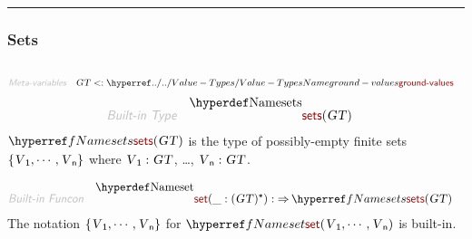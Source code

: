 

\begin{center}
\rule{3in}{0.4pt}
\end{center}

\subsubsection{Sets}\hypertarget{sets}{}\label{sets}

\begin{align*}
  [ \
  \KEY{Type} \quad & \NAMEREF{sets} \\
  \KEY{Funcon} \quad & \NAMEREF{set} \\
  \KEY{Funcon} \quad & \NAMEREF{set-elements} \\
  \KEY{Funcon} \quad & \NAMEREF{is-in-set} \\
  \KEY{Funcon} \quad & \NAMEREF{is-subset} \\
  \KEY{Funcon} \quad & \NAMEREF{set-insert} \\
  \KEY{Funcon} \quad & \NAMEREF{set-unite} \\
  \KEY{Funcon} \quad & \NAMEREF{set-intersect} \\
  \KEY{Funcon} \quad & \NAMEREF{set-difference} \\
  \KEY{Funcon} \quad & \NAMEREF{set-size} \\
  \KEY{Funcon} \quad & \NAMEREF{some-element} \\
  \KEY{Funcon} \quad & \NAMEREF{element-not-in}
  \ ]
\end{align*}
\begin{align*}
  \KEY{Meta-variables} \quad
  & \VAR{GT} <: \NAMEHYPER{../..}{Value-Types}{ground-values}
\end{align*}
\begin{align*}
  \KEY{Built-in Type} \quad 
  & \NAMEDECL{sets}(
                       \VAR{GT} )  
\end{align*}
$\SHADE{\NAMEREF{sets}
           (  \VAR{GT} )}$ is the type of possibly-empty finite sets $\SHADE{\{  \VAR{V}\SUB{1}, 
                 \cdots, 
                 \VAR{V}\SUB{n} \}}$ 
  where $\SHADE{\VAR{V}\SUB{1} : \VAR{GT}}$, \ldots{}, $\SHADE{\VAR{V}\SUB{n} : \VAR{GT}}$.

\begin{align*}
  \KEY{Built-in Funcon} \quad
  & \NAMEDECL{set}(
                       \_ : (  \VAR{GT} )\STAR) 
    :  \TO \NAMEREF{sets}
                     (  \VAR{GT} ) 
\end{align*}
The notation $\SHADE{\{  \VAR{V}\SUB{1}, 
                 \cdots, 
                 \VAR{V}\SUB{n} \}}$ for $\SHADE{\NAMEREF{set}
           (  \VAR{V}\SUB{1}, 
                  \cdots, 
                  \VAR{V}\SUB{n} )}$ is built-in.

